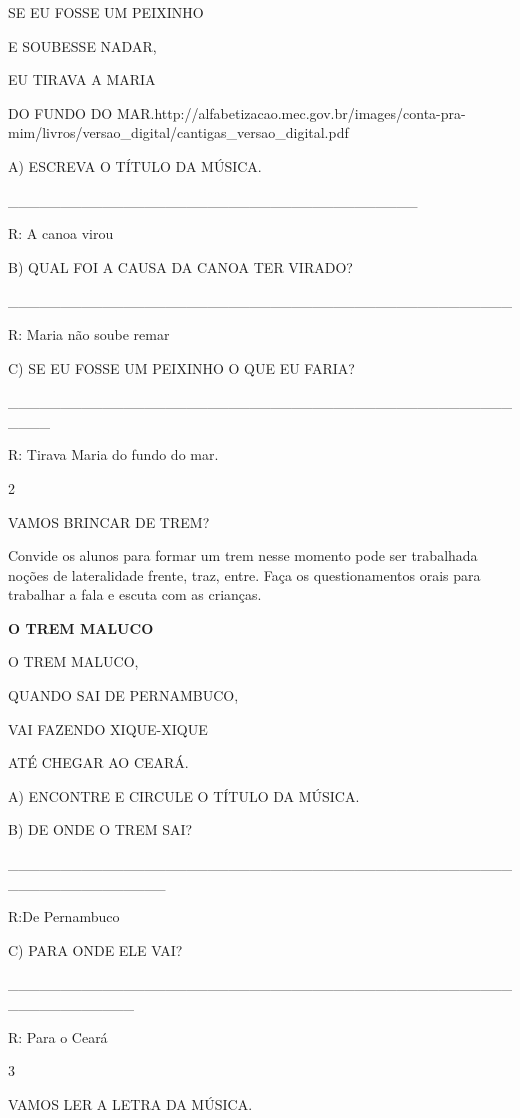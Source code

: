 {{{SE EU FOSSE UM PEIXINHO

E SOUBESSE NADAR,

EU TIRAVA A MARIA

DO FUNDO DO
MAR.http://alfabetizacao.mec.gov.br/images/conta-pra-mim/livros/versao\_digital/cantigas\_versao\_digital.pdf

A) ESCREVA O TÍTULO DA MÚSICA.

\_\_\_\_\_\_\_\_\_\_\_\_\_\_\_\_\_\_\_\_\_\_\_\_\_\_\_\_\_\_\_\_\_\_\_\_\_\_\_

R: A canoa virou

B) QUAL FOI A CAUSA DA CANOA TER VIRADO?

\_\_\_\_\_\_\_\_\_\_\_\_\_\_\_\_\_\_\_\_\_\_\_\_\_\_\_\_\_\_\_\_\_\_\_\_\_\_\_\_\_\_\_\_\_\_\_\_

R: Maria não soube remar

C) SE EU FOSSE UM PEIXINHO O QUE EU FARIA?

\_\_\_\_\_\_\_\_\_\_\_\_\_\_\_\_\_\_\_\_\_\_\_\_\_\_\_\_\_\_\_\_\_\_\_\_\_\_\_\_\_\_\_\_\_\_\_\_\_\_\_\_

R: Tirava Maria do fundo do mar.

\num{2}

VAMOS BRINCAR DE TREM?

Convide os alunos para formar um trem nesse momento pode ser trabalhada
noções de lateralidade frente, traz, entre. Faça os questionamentos
orais para trabalhar a fala e escuta com as crianças.

\textbf{O TREM MALUCO}

O TREM MALUCO,

QUANDO SAI DE PERNAMBUCO,

VAI FAZENDO XIQUE-XIQUE

ATÉ CHEGAR AO CEARÁ.

A) ENCONTRE E CIRCULE O TÍTULO DA MÚSICA.

B) DE ONDE O TREM SAI?

\_\_\_\_\_\_\_\_\_\_\_\_\_\_\_\_\_\_\_\_\_\_\_\_\_\_\_\_\_\_\_\_\_\_\_\_\_\_\_\_\_\_\_\_\_\_\_\_\_\_\_\_\_\_\_\_\_\_\_\_\_\_\_

R:De Pernambuco

C) PARA ONDE ELE VAI?

\_\_\_\_\_\_\_\_\_\_\_\_\_\_\_\_\_\_\_\_\_\_\_\_\_\_\_\_\_\_\_\_\_\_\_\_\_\_\_\_\_\_\_\_\_\_\_\_\_\_\_\_\_\_\_\_\_\_\_\_

R: Para o Ceará

\num{3}

VAMOS LER A LETRA DA MÚSICA.

}}}
